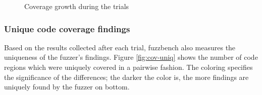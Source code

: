 \begin{figure}
    \caption{Coverage growth during the trials}
    \label{fig:cov-growth}
\end{figure}

\subsubsection{Unique code coverage findings}

Based on the results collected after each trial, fuzzbench also measures the uniqueness of the fuzzer's findings. Figure \ref{fig:cov-uniq} shows the number of code regions which were uniquely covered in a pairwise fashion. The coloring specifies the significance of the differences; the darker the color is, the more findings are uniquely found by the fuzzer on bottom.



